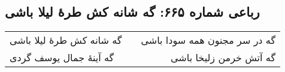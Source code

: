 \begin{center}
\section*{رباعی شماره ۶۶۵: گه شانه کش طرهٔ لیلا باشی}
\label{sec:sh665}
\begin{longtable}{l p{0.5cm} r}
گه شانه کش طرهٔ لیلا باشی
&&
گه در سر مجنون همه سودا باشی
\\
گه آینهٔ جمال یوسف گردی
&&
گه آتش خرمن زلیخا باشی
\\
\end{longtable}
\end{center}
